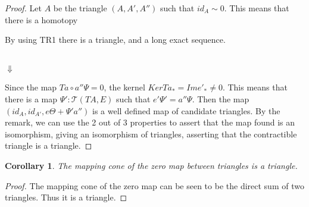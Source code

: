 \documentclass[11pt]{article}
\newtheorem{corollary}{Corollary}[theorem]
\theoremstyle{definition}
\theoremstyle{remark}
\begin{document}
            \begin{proof}
                Let $A$ be the triangle $(A,A',A'')$ such that $id_A \sim 0$. This means that there is a homotopy
                \begin{center}
                \end{center}
                By using TR1 there is a triangle, and a long exact sequence.
                \begin{center}
                     \\
                    $\Downarrow$ \\
                \end{center}
                Since the map $Ta\circ a''\Psi = 0$, the kernel $KerTa_*=Ime'_*\neq 0$. This means that there is a map ${\Psi}':\mathcal{T}(TA,E)$ such that $e'{\Psi}'=a''\Psi$. Then the map $(id_A,id_{A'},e\Theta+{\Psi}'a'')$ is a well defined map of candidate triangles. By the remark, we can use the 2 out of 3 properties to assert that the map found is an isomorphism, giving an isomorphism of triangles, asserting that the contractible triangle is a triangle. 
            \end{proof}

            \begin{corollary}
                The mapping cone of the zero map between  triangles is a triangle. 
            \end{corollary}

            \begin{proof}
                The mapping cone of the zero map can be seen to be the direct sum of two triangles. Thus it is a triangle.
            \end{proof}
\end{document}

